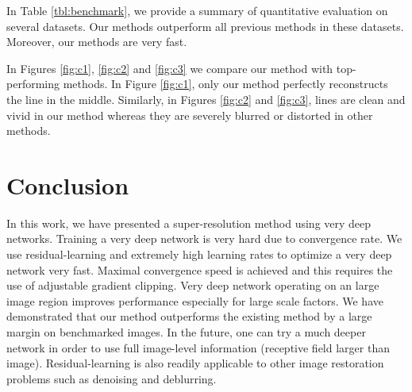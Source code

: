 \documentclass[10pt,twocolumn,letterpaper]{article}
\begin{document}
In Table \ref{tbl:benchmark}, we provide a summary of quantitative evaluation on several datasets. Our methods outperform all previous methods in these datasets. Moreover, our methods are very fast.

In Figures \ref{fig:c1}, \ref{fig:c2} and \ref{fig:c3} we compare our method with top-performing methods. In Figure \ref{fig:c1}, only our method perfectly reconstructs the line in the middle. Similarly, in Figures \ref{fig:c2} and \ref{fig:c3}, lines are clean and vivid in our method whereas they are severely blurred or distorted in other methods. 

\section{Conclusion}
In this work, we have presented a super-resolution method using very deep networks. Training a very deep network is very hard due to convergence rate. We use residual-learning and extremely high learning rates to optimize a very deep network very fast. Maximal convergence speed is achieved and this requires the use of adjustable gradient clipping. Very deep network operating on an large image region improves performance especially for large scale factors. We have demonstrated that our method outperforms the existing method by a large margin on benchmarked images. In the future, one can try a much deeper network in order to use full image-level information (receptive field larger than image). Residual-learning is also readily applicable to other image restoration problems such as denoising and deblurring.

{\small
	
	
}
\end{document}
